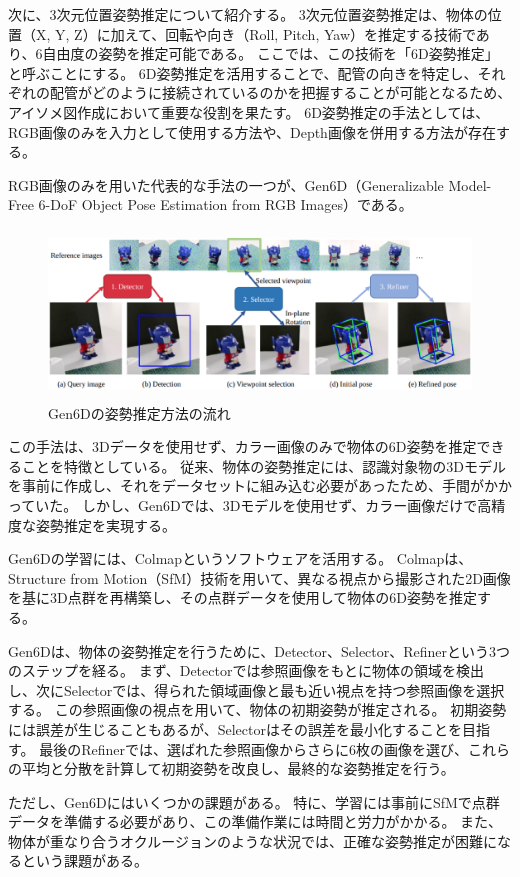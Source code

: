 次に、3次元位置姿勢推定について紹介する。
3次元位置姿勢推定は、物体の位置（X, Y, Z）に加えて、回転や向き（Roll, Pitch, Yaw）を推定する技術であり、6自由度の姿勢を推定可能である。
ここでは、この技術を「6D姿勢推定」と呼ぶことにする。
6D姿勢推定を活用することで、配管の向きを特定し、それぞれの配管がどのように接続されているのかを把握することが可能となるため、アイソメ図作成において重要な役割を果たす。
6D姿勢推定の手法としては、RGB画像のみを入力として使用する方法や、Depth画像を併用する方法が存在する。

RGB画像のみを用いた代表的な手法の一つが、Gen6D（Generalizable Model-Free 6-DoF Object Pose Estimation from RGB Images）である。
\begin{figure}[htbt]
	\centering
	 \includegraphics[height=45mm]{Figure/Gen6D.eps}
	 \caption{Gen6Dの姿勢推定方法の流れ}
	 \label{fig:f6}
\end{figure}

この手法は、3Dデータを使用せず、カラー画像のみで物体の6D姿勢を推定できることを特徴としている。
従来、物体の姿勢推定には、認識対象物の3Dモデルを事前に作成し、それをデータセットに組み込む必要があったため、手間がかかっていた。
しかし、Gen6Dでは、3Dモデルを使用せず、カラー画像だけで高精度な姿勢推定を実現する。

Gen6Dの学習には、Colmapというソフトウェアを活用する。
Colmapは、Structure from Motion（SfM）技術を用いて、異なる視点から撮影された2D画像を基に3D点群を再構築し、その点群データを使用して物体の6D姿勢を推定する。

Gen6Dは、物体の姿勢推定を行うために、Detector、Selector、Refinerという3つのステップを経る。
まず、Detectorでは参照画像をもとに物体の領域を検出し、次にSelectorでは、得られた領域画像と最も近い視点を持つ参照画像を選択する。
この参照画像の視点を用いて、物体の初期姿勢が推定される。
初期姿勢には誤差が生じることもあるが、Selectorはその誤差を最小化することを目指す。
最後のRefinerでは、選ばれた参照画像からさらに6枚の画像を選び、これらの平均と分散を計算して初期姿勢を改良し、最終的な姿勢推定を行う。

ただし、Gen6Dにはいくつかの課題がある。
特に、学習には事前にSfMで点群データを準備する必要があり、この準備作業には時間と労力がかかる。
また、物体が重なり合うオクルージョンのような状況では、正確な姿勢推定が困難になるという課題がある。

